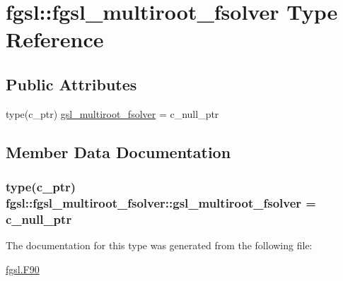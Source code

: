 \hypertarget{structfgsl_1_1fgsl__multiroot__fsolver}{}\section{fgsl\+:\+:fgsl\+\_\+multiroot\+\_\+fsolver Type Reference}
\label{structfgsl_1_1fgsl__multiroot__fsolver}
\subsection*{Public Attributes}
\begin{DoxyCompactItemize}
\item 
type(c\+\_\+ptr) \hyperlink{structfgsl_1_1fgsl__multiroot__fsolver_aa18e9ead08f58d7a72b39524c0fe9bc5}{gsl\+\_\+multiroot\+\_\+fsolver} = c\+\_\+null\+\_\+ptr
\end{DoxyCompactItemize}


\subsection{Member Data Documentation}
\hypertarget{structfgsl_1_1fgsl__multiroot__fsolver_aa18e9ead08f58d7a72b39524c0fe9bc5}{}
\subsubsection[{gsl\+\_\+multiroot\+\_\+fsolver}]{\setlength{\rightskip}{0pt plus 5cm}type(c\+\_\+ptr) fgsl\+::fgsl\+\_\+multiroot\+\_\+fsolver\+::gsl\+\_\+multiroot\+\_\+fsolver = c\+\_\+null\+\_\+ptr}\label{structfgsl_1_1fgsl__multiroot__fsolver_aa18e9ead08f58d7a72b39524c0fe9bc5}


The documentation for this type was generated from the following file\+:\begin{DoxyCompactItemize}
\item 
\hyperlink{fgsl_8F90}{fgsl.\+F90}\end{DoxyCompactItemize}
